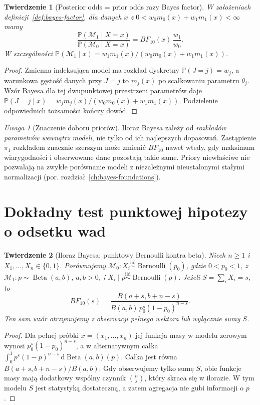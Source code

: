 \documentclass[11pt,a4paper,oneside]{report}
\numberwithin{equation}{chapter}
\theoremstyle{plain}
\newtheorem{twierdzenie}{Twierdzenie}[chapter]
\theoremstyle{definition}
\theoremstyle{remark}
\newtheorem{uwaga}{Uwaga}[chapter]
\newcommand{\Prob}{\mathbb P}
\newcommand{\dd}{\mathrm d}
\newcommand{\iid}{\mathrel{\overset{\mathrm{iid}}\sim}}
\begin{document}
\begin{twierdzenie}[Posterior odds = prior odds razy Bayes factor]
\label{thm:bayes-odds}
W założeniach definicji~\ref{def:bayes-factor}, dla danych
$x$ z $0<w_0m_0(x)+w_1m_1(x)<\infty$ mamy
\[
\frac{\Prob(\mathcal M_1\mid X=x)}
     {\Prob(\mathcal M_0\mid X=x)}
=BF_{10}(x)\,\frac{w_1}{w_0}.
\]
W szczególności $\Prob(\mathcal M_1\mid x)
=w_1m_1(x)/(w_0m_0(x)+w_1m_1(x))$.
\end{twierdzenie}
\begin{proof}
Zmienna indeksująca model ma rozkład dyskretny
$\Prob(J=j)=w_j$, a warunkowa gęstość danych przy $J=j$
to $m_j(x)$ po scałkowaniu parametru $\theta_j$.
Wzór Bayesa dla tej dwupunktowej przestrzeni
parametrów daje $\Prob(J=j\mid x)=w_jm_j(x)/
(w_0m_0(x)+w_1m_1(x))$. Podzielenie odpowiednich
tożsamości kończy dowód.
\end{proof}

\begin{uwaga}[Znaczenie doboru priorów]
Iloraz Bayesa zależy od \emph{rozkładów parametrów wewnątrz
modeli}, nie tylko od ich najlepszych dopasowań. Zastąpienie
$\pi_1$ rozkładem znacznie szerszym może zmienić
$BF_{10}$ nawet wtedy, gdy maksimum wiarygodności i
obserwowane dane pozostają takie same. Priory niewłaściwe
nie pozwalają na zwykłe porównanie modeli z niezależnymi
nieustalonymi stałymi normalizacji
(por. rozdział~\ref{ch:bayes-foundations}).
\end{uwaga}

\section{Dokładny test punktowej hipotezy o odsetku wad}
\begin{twierdzenie}[Iloraz Bayesa: punktowy Bernoulli kontra beta]
\label{thm:bernoulli-point-bf}
Niech $n\ge1$ i $X_1,\ldots,X_n\in\{0,1\}$. Porównujemy
$\mathcal M_0: X_i\iid\operatorname{Bernoulli}(p_0)$,
gdzie $0<p_0<1$, z
$\mathcal M_1: p\sim\operatorname{Beta}(a,b)$,
$a,b>0$, i $X_i\mid p\iid\operatorname{Bernoulli}(p)$.
Jeżeli $S=\sum_iX_i=s$, to
\[
BF_{10}(s)=\frac{B(a+s,b+n-s)}{B(a,b)\,p_0^s(1-p_0)^{n-s}}.
\]
Ten sam wzór otrzymujemy z obserwacji pełnego wektora
lub wyłącznie sumy $S$.
\end{twierdzenie}
\begin{proof}
Dla pełnej próbki $x=(x_1,\ldots,x_n)$ jej funkcja masy
w modelu zerowym wynosi
$p_0^s(1-p_0)^{n-s}$, a w alternatywnym całka
$\int_0^1p^s(1-p)^{n-s}\,\dd\operatorname{Beta}(a,b)(p)$.
Całka jest równa $B(a+s,b+n-s)/B(a,b)$.
Gdy obserwujemy tylko sumę $S$, obie funkcje masy mają
dodatkowy wspólny czynnik $\binom ns$, który skraca się
w ilorazie. W tym modelu $S$ jest statystyką dostateczną,
a zatem agregacja nie gubi informacji o $p$.
\end{proof}
\end{document}
